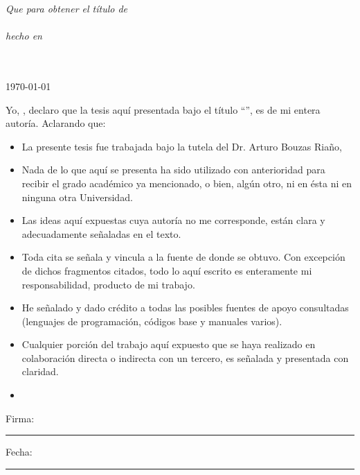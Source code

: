 \documentclass[
11pt, %
spanish, %
singlespacing, %
headsepline, %
]{MastersDoctoralThesis} %
\begin{document}
\begin{titlepage}
\begin{center}
\large \textit{Que para obtener el título de\\ \degreename}\\[0.3cm] %
\textit{hecho en}\\[0.4cm]
\groupname\\\deptname\\[2cm] %
 
\vfill

{\large \today}\\[4cm] %
 
\vfill
\end{center}
\end{titlepage}


\begin{declaration}
\addchaptertocentry{\authorshipname} %
\noindent Yo, \authorname, declaro que la tesis aquí presentada bajo el título \enquote{\ttitle}, es de mi entera autoría. Aclarando que:\\

\begin{itemize} 
\item La presente tesis fue trabajada bajo la tutela del Dr. Arturo Bouzas Riaño, 
\item Nada de lo que aquí se presenta ha sido utilizado con anterioridad para recibir el grado académico ya mencionado, o bien, algún otro, ni en ésta ni en ninguna otra Universidad. 
\item Las ideas aquí expuestas cuya autoría no me corresponde, están clara y adecuadamente señaladas en el texto. 
\item Toda cita se señala y vincula a la fuente de donde se obtuvo. Con excepción de dichos fragmentos citados, todo lo aquí escrito es enteramente mi responsabilidad, producto de mi trabajo. 
\item He señalado y dado crédito a todas las posibles fuentes de apoyo consultadas (lenguajes de programación, códigos base y manuales varios).
\item Cualquier porción del trabajo aquí expuesto que se haya realizado en colaboración directa o indirecta con un tercero, es señalada y presentada con claridad.
\item \\
\end{itemize}
 
\noindent Firma:\\
\rule[0.5em]{25em}{0.5pt} %
 
\noindent Fecha:\\
\rule[0.5em]{25em}{0.5pt} %
\end{declaration}
\end{document}
